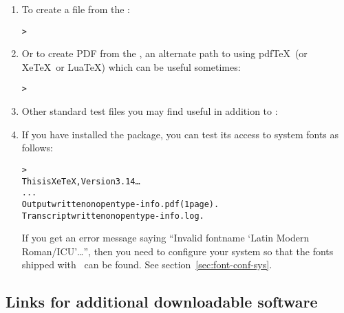 \documentclass{article}
\begin{document}
\begin{enumerate}
\item To create a \PS{} file from the \dvi:
\begin{alltt}
> 
\end{alltt}

\item Or to create PDF from the \dvi{}, an alternate path to using
pdf\TeX\ (or Xe\TeX\ or Lua\TeX) which can be useful sometimes:
\begin{alltt}
> 
\end{alltt}

\item Other standard test files you may find useful in addition to
:


\item If you have installed the  package, you can test
its access to system fonts as follows:
\begin{alltt}
> 
This is XeTeX, Version 3.14\dots
...
Output written on opentype-info.pdf (1 page).
Transcript written on opentype-info.log.
\end{alltt}

If you get an error message saying ``Invalid fontname `Latin Modern
Roman/ICU'\dots'', then you need to configure your system so that the
fonts shipped with \TL\ can be found.  See
section~\ref{sec:font-conf-sys}.

\end{enumerate}

\subsection{Links for additional downloadable software}
\end{document}
